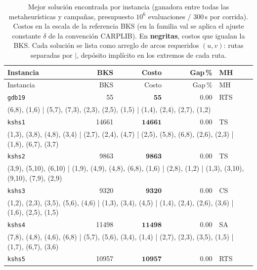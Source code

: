 \begingroup\scriptsize
\begin{longtable}{lrrrl}
\caption{Mejor solución encontrada por instancia (ganadora entre todas las metaheurísticas y campañas, presupuesto $10^6$ evaluaciones / 300\,s por corrida). Costos en la escala de la referencia BKS (en la familia val se aplica el ajuste constante $\delta$ de la convención CARPLIB). En \textbf{negritas}, costos que igualan la BKS. Cada solución se lista como arreglo de arcos requeridos $(u,v)$: rutas separadas por $|$, depósito implícito en los extremos de cada ruta.}\label{tab:soluciones-por-instancia}\\
\toprule
Instancia & BKS & Costo & Gap\,\% & MH \\
\midrule
\endfirsthead
\toprule
Instancia & BKS & Costo & Gap\,\% & MH \\
\midrule
\endhead
\bottomrule
\endfoot
\texttt{gdb19} & 55 & $\mathbf{55}$ & 0.00 & RTS \\
\multicolumn{5}{p{0.96\linewidth}}{\tiny\raggedright\arraybackslash (6,8), (1,6) | (5,7), (7,3), (2,3), (2,5), (1,5) | (1,4), (2,4), (2,7), (1,2)} \\[2pt]
\texttt{kshs1} & 14661 & $\mathbf{14661}$ & 0.00 & TS \\
\multicolumn{5}{p{0.96\linewidth}}{\tiny\raggedright\arraybackslash (1,3), (3,8), (4,8), (3,4) | (2,7), (2,4), (4,7) | (2,5), (5,8), (6,8), (2,6), (2,3) | (1,8), (6,7), (3,7)} \\[2pt]
\texttt{kshs2} & 9863 & $\mathbf{9863}$ & 0.00 & TS \\
\multicolumn{5}{p{0.96\linewidth}}{\tiny\raggedright\arraybackslash (3,9), (5,10), (6,10) | (1,9), (4,9), (4,8), (6,8), (1,6) | (2,8), (1,2) | (1,3), (3,10), (9,10), (7,9), (2,9)} \\[2pt]
\texttt{kshs3} & 9320 & $\mathbf{9320}$ & 0.00 & CS \\
\multicolumn{5}{p{0.96\linewidth}}{\tiny\raggedright\arraybackslash (1,2), (2,3), (3,5), (5,6), (4,6) | (1,3), (3,4), (4,5) | (1,4), (2,4), (2,6), (3,6) | (1,6), (2,5), (1,5)} \\[2pt]
\texttt{kshs4} & 11498 & $\mathbf{11498}$ & 0.00 & SA \\
\multicolumn{5}{p{0.96\linewidth}}{\tiny\raggedright\arraybackslash (7,8), (4,8), (4,6), (6,8) | (5,7), (5,6), (3,4), (1,4) | (2,7), (2,3), (3,5), (1,5) | (1,7), (6,7), (3,6)} \\[2pt]
\texttt{kshs5} & 10957 & $\mathbf{10957}$ & 0.00 & RTS \\

\end{longtable}
